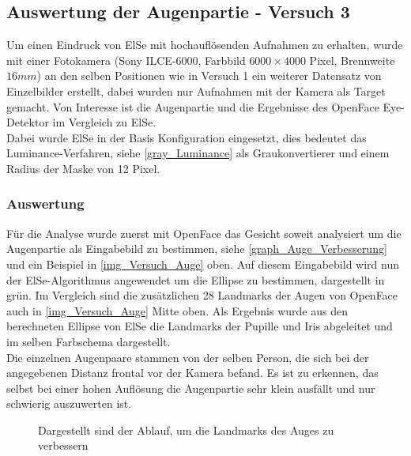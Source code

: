 \subsection{Auswertung der Augenpartie - Versuch 3}
Um einen Eindruck von ElSe mit hochauflösenden Aufnahmen zu erhalten, wurde mit einer Fotokamera (Sony ILCE-6000, Farbbild $6000\times 4000$ Pixel, Brennweite $16mm$) an den selben Positionen wie in Versuch 1 ein weiterer Datensatz von Einzelbilder erstellt, dabei wurden nur Aufnahmen mit der Kamera als Target gemacht. Von Interesse ist die Augenpartie und die Ergebnisse des OpenFace Eye-Detektor im Vergleich zu ElSe.\\
Dabei wurde ElSe in der Basis Konfiguration eingesetzt, dies bedeutet das Luminance-Verfahren, siehe \autoref{gray_Luminance} als Graukonvertierer und einem Radius der Maske von 12 Pixel.
\subsubsection{Auswertung}
Für die Analyse wurde zuerst mit OpenFace das Gesicht soweit analysiert um die Augenpartie als Eingabebild zu bestimmen, siehe \autoref{graph_Auge_Verbesserung} und ein Beispiel in \autoref{img_Versuch_Auge} oben. Auf diesem Eingabebild wird nun der ElSe-Algorithmus angewendet um die Ellipse zu bestimmen, dargestellt in grün. Im Vergleich sind die zusätzlichen 28 Landmarks der Augen von OpenFace auch in \autoref{img_Versuch_Auge} Mitte oben. Als Ergebnis wurde aus den berechneten Ellipse von ElSe die Landmarks der Pupille und Iris abgeleitet und im selben Farbschema dargestellt.\\
Die einzelnen Augenpaare stammen von der selben Person, die sich bei der angegebenen Distanz frontal vor der Kamera befand. Es ist zu erkennen, das selbst bei einer hohen Auflösung die Augenpartie sehr klein ausfällt und nur schwierig auszuwerten ist.
\begin{figure}
	\centering
	
	\caption{Dargestellt sind der Ablauf, um die Landmarks des Auges zu verbessern}
	\label{graph_Auge_Verbesserung}
\end{figure}
